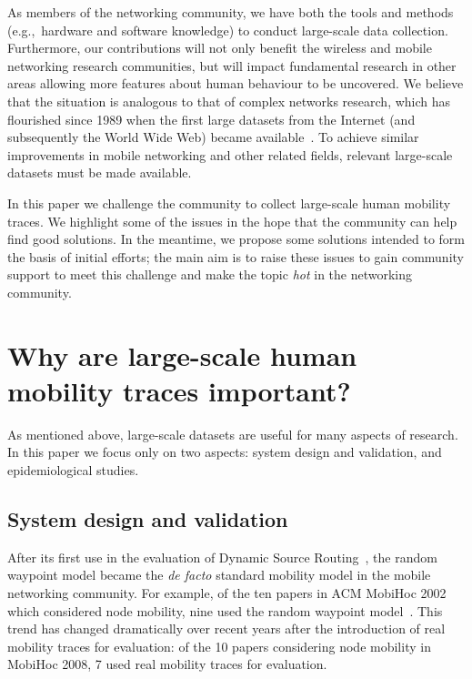 \documentclass{sig-alternate-10pt}
\begin{document}
As members of the networking community, we have both the tools and methods (e.g.,~hardware
and software knowledge) to conduct large-scale data collection.
Furthermore, our contributions will not only benefit the wireless and
mobile networking research communities, but will impact fundamental
research in other areas allowing more features about human behaviour
to be uncovered.  We believe that the situation is analogous to that
of complex networks research, which has flourished since 1989 when the
first large datasets from the Internet (and subsequently the World
Wide Web) became available~\cite{albert-2002-74}.  To achieve similar
improvements in mobile networking and other related fields, relevant
large-scale datasets must be made available.

In this paper we challenge the community to collect large-scale human
mobility traces.  We highlight some of the issues in the hope that the
community can help find good solutions.  In the meantime, we propose
some solutions intended to form the basis of initial efforts; the main
aim is to raise these issues to gain community support to meet this
challenge and make the topic \emph{hot} in the networking community.
\vspace{-2mm}

\section{Why are large-scale human mobility traces important?}
\vspace{-2mm}
As mentioned above, large-scale datasets are useful for many
aspects of research. In this paper we focus only on two aspects:
system design and validation, and epidemiological studies.

\subsection{System design and validation}
\vspace{-1mm}
After its first use in the evaluation of Dynamic Source
Routing~\cite{Johnson96dynamicsource}, the random waypoint model
became the \emph{de facto} standard mobility model in the mobile
networking community. For example, of the ten papers in ACM MobiHoc 2002
which considered node mobility, nine used the random waypoint
model~\cite{yoon:random}.  This trend has changed dramatically over
recent years after the introduction of real mobility traces for
evaluation: of the 10 papers considering node mobility in MobiHoc 2008,
7 used real mobility traces for evaluation.
\end{document}
